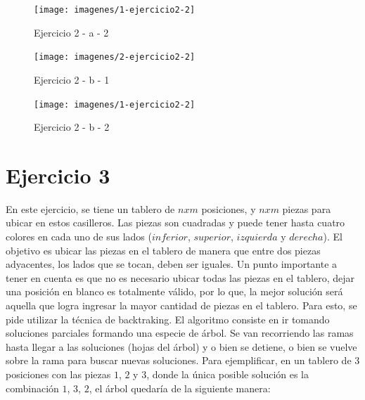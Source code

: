 \documentclass[11pt,a4paper]{article}
\begin{document}
    	\begin{center}
          \begin{figure}[H]
                \caption{Ejercicio 2 - a - 2}
        	\texttt{[image: imagenes/1-ejercicio2-2]}
                \label{ej212}
          \end{figure}
    	\end{center}

    	\begin{center}
          \begin{figure}[H]
                \caption{Ejercicio 2 - b - 1}
        	\texttt{[image: imagenes/2-ejercicio2-2]}
                \label{ej221}
          \end{figure}
    	\end{center}

    	\begin{center}
          \begin{figure}[H]
                \caption{Ejercicio 2 - b - 2}
        	\texttt{[image: imagenes/1-ejercicio2-2]}
                \label{ej222}
          \end{figure}
    	\end{center}



\section*{Ejercicio 3}

En este ejercicio, se tiene un tablero de $nxm$ posiciones, y $nxm$ piezas para ubicar en estos casilleros. Las piezas son cuadradas y puede tener hasta cuatro colores en cada uno de sus lados ($inferior$, $superior$, $izquierda$ y $derecha$). El objetivo es ubicar las piezas en el tablero de manera que entre dos piezas adyacentes, los lados que se tocan, deben ser iguales.
Un punto importante a tener en cuenta es que no es necesario ubicar todas las piezas en el tablero, dejar una posición en blanco es totalmente válido, por lo que, la mejor solución será aquella que logra ingresar la mayor cantidad de piezas en el tablero.
Para esto, se pide utilizar la técnica de backtraking. El algoritmo consiste en ir tomando soluciones parciales formando una especie de árbol. Se van recorriendo las ramas hasta llegar a las soluciones (hojas del árbol) y o bien se detiene, o bien se vuelve sobre la rama para buscar nuevas soluciones. Para ejemplificar, en un tablero de 3 posiciones con las piezas $1$, $2$ y $3$, donde la única posible solución es la combinación $1$, $3$, $2$, el árbol quedaría de la siguiente manera:
\end{document}

